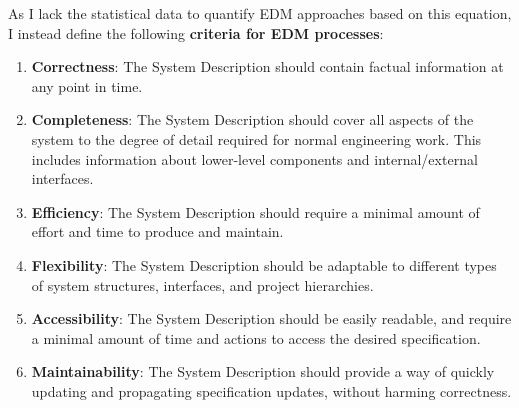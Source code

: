 \documentclass[a4paper,nobib,justified,final]{tufte-book}
\begin{document}
As I lack the statistical data to quantify \ac{EDM} approaches based on this equation, I instead define the following \textbf{criteria for \acl{EDM} processes}:
\begin{enumerate}
	\item \textbf{Correctness}: The System Description should contain factual information at any point in time.
	\item \textbf{Completeness}: The System Description should cover all aspects of the system to the degree of detail required for normal engineering work. This includes information about lower-level components and internal/external interfaces.
	\item \textbf{Efficiency}: The System Description should require a minimal amount of effort and time to produce and maintain.
	\item \textbf{Flexibility}: The System Description should be adaptable to different types of system structures, interfaces, and project hierarchies.
	\item \textbf{Accessibility}: The System Description should be easily readable, and require a minimal amount of time and actions to access the desired specification.
	\item \textbf{Maintainability}: The System Description should provide a way of quickly updating and propagating specification updates, without harming correctness.
\end{enumerate}
\end{document}
